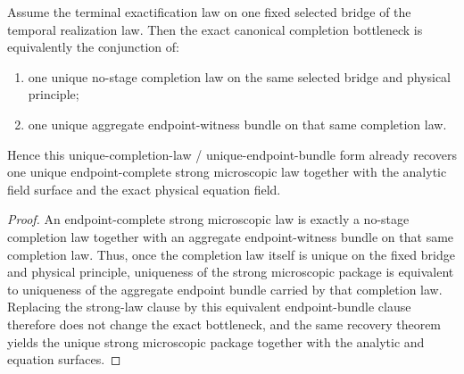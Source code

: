\begin{theorem}
\label{thm:canonical-completion-bottleneck-iff-unique-completion-law-plus-unique-endpoint-bundle}
Assume the terminal exactification law on one fixed selected bridge of the
temporal realization law. Then the exact canonical completion bottleneck is
equivalently the conjunction of:
\begin{enumerate}
\item one unique no-stage completion law on the same selected bridge and
physical principle;
\item one unique aggregate endpoint-witness bundle on that same
completion law.
\end{enumerate}
Hence this unique-completion-law / unique-endpoint-bundle form already
recovers one unique endpoint-complete strong microscopic law together with the
analytic field surface and the exact physical equation field.
\end{theorem}

\begin{proof}
An endpoint-complete strong microscopic law is exactly a no-stage completion
law together with an aggregate endpoint-witness bundle on that same
completion law. Thus, once the completion law itself is unique on the fixed
bridge and physical principle, uniqueness of the strong microscopic package is
equivalent to uniqueness of the aggregate endpoint bundle carried by that
completion law. Replacing the strong-law clause by this equivalent endpoint-bundle
clause therefore does not change the exact bottleneck, and the same recovery
theorem yields the unique strong microscopic package together with the analytic
and equation surfaces.
\end{proof}

